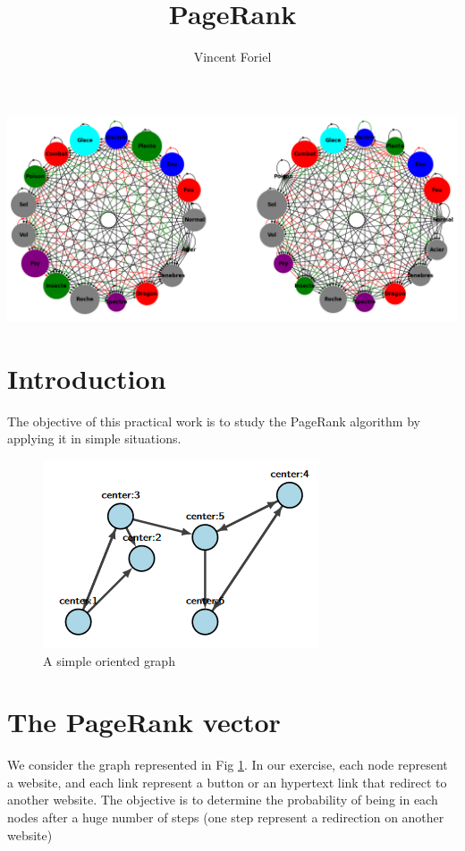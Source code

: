 \documentclass[12pt]{article}
\begin{document}
\title{PageRank}
\author{Vincent Foriel}

\maketitle
\includegraphics[width=\textwidth]{images/pokemon.png}
\newpage
\tableofcontents
\newpage

\section{Introduction}
The objective of this practical work is to study the PageRank algorithm by applying it in simple situations.

\begin{figure}[ht]
    \centering
    \includegraphics{images/graph.png}
    \caption{A simple oriented graph}
    \label{fig:graph}
\end{figure}

\section{The PageRank vector}

We consider the graph represented in Fig \ref{fig:graph}. In our exercise, each node represent a website, and each link represent a button or an hypertext link that redirect to another website. The objective is to determine the probability of being in each nodes after a huge number of steps (one step represent a redirection on another website)
\end{document}
